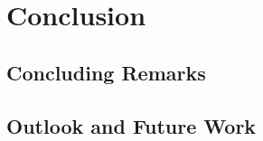 \chapter{Conclusion}
\label{chap:conlusion}

\section{Concluding Remarks}

\section{Outlook and Future Work}